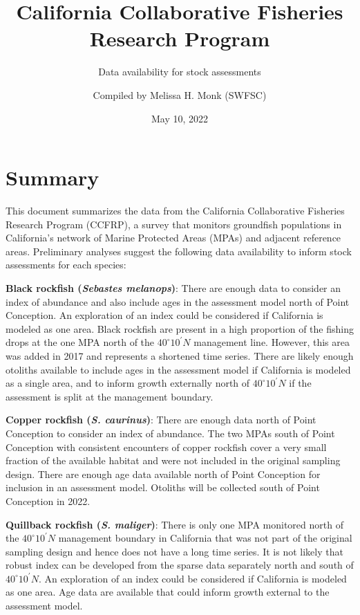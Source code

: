 \documentclass[
]{article}
\title{California Collaborative Fisheries Research Program}
\subtitle{Data availability for stock assessments}
\author{Compiled by Melissa H. Monk (SWFSC)}
\date{May 10, 2022}
\begin{document}
\maketitle

\newcommand\CapeM{$40^\circ 10^\prime N$}

\hypertarget{summary}{%
\section{Summary}\label{summary}}

This document summarizes the data from the California Collaborative
Fisheries Research Program (CCFRP), a survey that monitors groundfish populations
in California's network of Marine Protected Areas (MPAs) and adjacent reference areas.
Preliminary analyses suggest the following data availability to inform stock
assessments for each species:

\textbf{Black rockfish (\emph{Sebastes melanops})}: There are enough data to consider an
index of abundance and also include ages in the assessment model north of Point
Conception. An exploration of an index could be considered if California is
modeled as one area. Black rockfish are present in a high proportion of the fishing drops
at the one MPA north of the $40^\circ 10^\prime N$ management line. However, this area was added in
2017 and represents a shortened time series. There are likely enough otoliths available
to include ages in the assessment model if California is modeled as a single area, and to
inform growth externally north of $40^\circ 10^\prime N$ if the assessment is split at the management
boundary.

\textbf{Copper rockfish (\emph{S. caurinus})}: There are enough data north of Point Conception
to consider an index of abundance. The two MPAs south of Point Conception with consistent encounters
of copper rockfish cover a very small fraction of the available habitat and were not
included in the original sampling design. There are enough age data available north
of Point Conception for inclusion in an assessment model. Otoliths will be
collected south of Point Conception in 2022.

\textbf{Quillback rockfish (\emph{S. maliger})}: There is only one MPA monitored north of the $40^\circ 10^\prime N$ management
boundary in California that was not part of the original sampling design and hence
does not have a long time series. It is not likely that robust index can be developed
from the sparse data separately north and south of $40^\circ 10^\prime N$. An exploration of an index
could be considered if California is modeled as one area. Age data are available
that could inform growth external to the assessment model.
\end{document}
